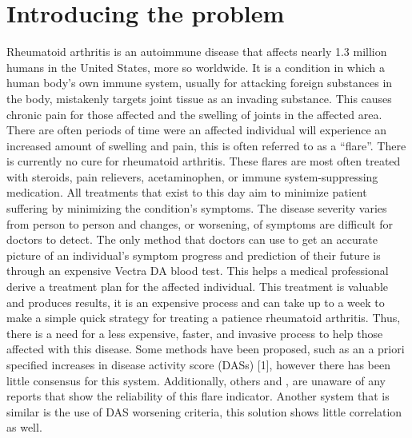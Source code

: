 \documentclass[10pt,journal,draftclsnofoot,onecolumn]{IEEEtran}
\begin{document}
\section{Introducing the problem}
Rheumatoid arthritis is an autoimmune disease that affects nearly 1.3 million humans in the United States, more so worldwide. It is a condition in which a human body’s own immune system, usually for attacking foreign substances in the body, mistakenly targets joint tissue as an invading substance. This causes chronic pain for those affected and the swelling of joints in the affected area. There are often periods of time were an affected individual will experience an increased amount of swelling and pain, this is often referred to as a “flare”. There is currently no cure for rheumatoid arthritis.
These flares are most often treated with steroids, pain relievers, acetaminophen, or immune system-suppressing medication. All treatments that exist to this day aim to minimize patient suffering by minimizing the condition’s symptoms. The disease severity varies from person to person and changes, or worsening, of symptoms are difficult for doctors to detect. The only method that doctors can use to get an accurate picture of an individual’s symptom progress and prediction of their future is through an expensive Vectra DA blood test. This helps a medical professional derive a treatment plan for the affected individual. This treatment is valuable and produces results, it is an expensive process and can take up to a week to make a simple quick strategy for treating a patience rheumatoid arthritis. 
Thus, there is a need for a less expensive, faster, and invasive process to help those affected with this disease. Some methods have been proposed, such as an a priori specified increases in disease activity score (DASs) [1], however there has been little consensus for this system. Additionally, others and , are unaware of any reports that show the reliability of this flare indicator. Another system that is similar is the use of DAS worsening criteria, this solution shows little correlation as well.

\newpage
\end{document}
